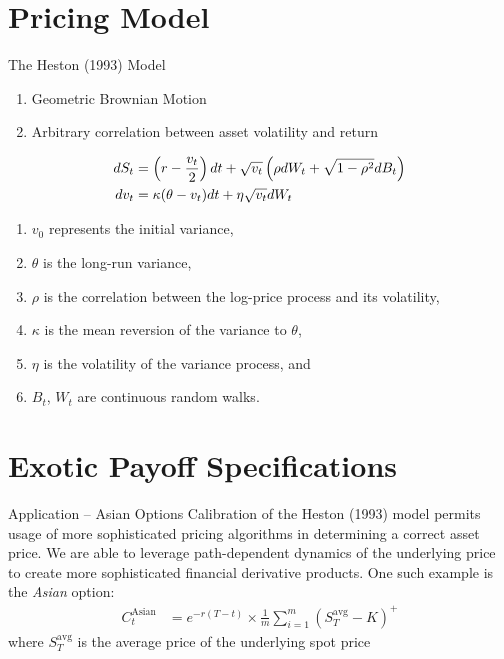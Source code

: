 \documentclass[aspectratio=169,xcolor=dvipsnames]{beamer}
\begin{document}
	\section{Pricing Model}
	
		\begin{frame}{The Heston (1993) Model}
			\begin{enumerate}
				\item Geometric Brownian Motion
				\item Arbitrary correlation between asset volatility and return
			\end{enumerate}
			\begin{align}
				dS_t &= \left( r - \frac{v_t}{2} \right) dt + \sqrt{v_t} \left( \rho dW_t + \sqrt{1 - \rho^2} dB_t \right) \label{eq:hdXt} \\
				dv_t &= \kappa (\theta - v_t) dt + \eta \sqrt{v_t} dW_t \hspace{1.8cm} \label{eq:hdvt}
			\end{align}
			\begin{enumerate}
				\item $v_0$ represents the initial variance,
				\item $\theta$ is the long-run variance,
				\item $\rho$ is the correlation between the log-price process and its volatility,
				\item $\kappa$ is the mean reversion of the variance to $\theta$,
				\item $\eta$ is the volatility of the variance process, and 
				\item $B_{t}$, $W_{t}$ are continuous random walks.
			\end{enumerate}
		\end{frame}
	
	\section{Exotic Payoff Specifications}
	
		\begin{frame}{Application -- Asian Options}
		Calibration of the Heston (1993) model permits usage of more sophisticated pricing algorithms in determining a correct asset price. We are able to leverage path-dependent dynamics of the underlying price to create more sophisticated financial derivative products. One such example is the \textit{Asian} option:
			\begin{align}
				\label{eq:asianPayoff}
				C^{\text{Asian}}_t &= e^{-r(T-t)} \times \frac{1}{m} \sum_{i=1}^{m} (S_{T}^{\text{avg}} - K)^{+}
			\end{align}
			where $S_{T}^{\text{avg}}$ is the average price of the underlying spot price
		\end{frame}
		
\end{document}
